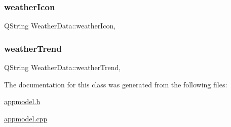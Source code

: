 \mbox{\label{class_weather_data_aca04e1877e2d5bc6da0f1e9910553741}} 
\subsubsection{\texorpdfstring{weather\+Icon}{weatherIcon}}
{\footnotesize\ttfamily Q\+String Weather\+Data\+::weather\+Icon\hspace{0.3cm}{\ttfamily [read]}, {\ttfamily [write]}}

\mbox{\label{class_weather_data_a32541f768ce8d987063863610821580f}} 
\subsubsection{\texorpdfstring{weather\+Trend}{weatherTrend}}
{\footnotesize\ttfamily Q\+String Weather\+Data\+::weather\+Trend\hspace{0.3cm}{\ttfamily [read]}, {\ttfamily [write]}}



The documentation for this class was generated from the following files\+:\begin{DoxyCompactItemize}
\item 
\hyperlink{appmodel_8h}{appmodel.\+h}\item 
\hyperlink{appmodel_8cpp}{appmodel.\+cpp}\end{DoxyCompactItemize}

